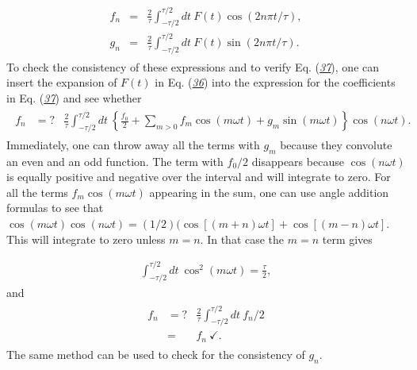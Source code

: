 \documentclass[letterpaper,10pt,english]{sphinxmanual}
\begin{document}
\begin{equation*}
\begin{split}
\begin{eqnarray}
\label{eq:fourierdef2} \tag{37}
f_n&=&\frac{2}{\tau}\int_{-\tau/2}^{\tau/2} dt~F(t)\cos(2n\pi t/\tau),\\
\nonumber
g_n&=&\frac{2}{\tau}\int_{-\tau/2}^{\tau/2} dt~F(t)\sin(2n\pi t/\tau).
\end{eqnarray}
\end{split}
\end{equation*}
To check the consistency of these expressions and to verify
Eq. ({\hyperref[\detokenize{chapter4:eq:fourierdef2}]{\emph{37}}}), one can insert the expansion of \(F(t)\) in
Eq. ({\hyperref[\detokenize{chapter4:eq:fourierdef1}]{\emph{36}}}) into the expression for the coefficients in
Eq. ({\hyperref[\detokenize{chapter4:eq:fourierdef2}]{\emph{37}}}) and see whether
\begin{equation*}
\begin{split}
\begin{eqnarray}
f_n&=?&\frac{2}{\tau}\int_{-\tau/2}^{\tau/2} dt~\left\{
\frac{f_0}{2}+\sum_{m>0}f_m\cos(m\omega t)+g_m\sin(m\omega t)
\right\}\cos(n\omega t).
\end{eqnarray}
\end{split}
\end{equation*}
Immediately, one can throw away all the terms with \(g_m\) because they
convolute an even and an odd function. The term with \(f_0/2\)
disappears because \(\cos(n\omega t)\) is equally positive and negative
over the interval and will integrate to zero. For all the terms
\(f_m\cos(m\omega t)\) appearing in the sum, one can use angle addition
formulas to see that \(\cos(m\omega t)\cos(n\omega
t)=(1/2)(\cos[(m+n)\omega t]+\cos[(m-n)\omega t]\). This will integrate
to zero unless \(m=n\). In that case the \(m=n\) term gives




\begin{equation*}
\begin{split}
\begin{equation}
\int_{-\tau/2}^{\tau/2}dt~\cos^2(m\omega t)=\frac{\tau}{2},
\label{_auto27} \tag{38}
\end{equation}
\end{split}
\end{equation*}
and
\begin{equation*}
\begin{split}
\begin{eqnarray}
f_n&=?&\frac{2}{\tau}\int_{-\tau/2}^{\tau/2} dt~f_n/2\\
\nonumber
&=&f_n~\checkmark.
\end{eqnarray}
\end{split}
\end{equation*}
The same method can be used to check for the consistency of \(g_n\).
\end{document}
